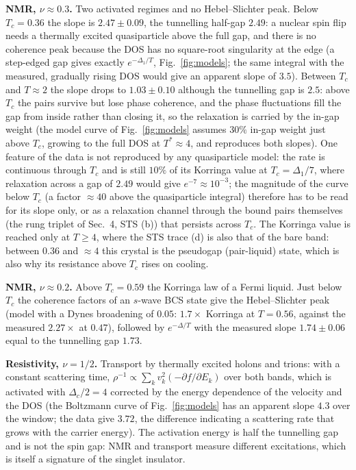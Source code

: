 \documentclass[11pt]{article}
\newcommand{\nuh}{\nu=1/2}
\newcommand{\nut}{\nu\approx0.3}
\newcommand{\nutw}{\nu\approx0.2}
\begin{document}
\textbf{NMR, $\nut$.} Two activated regimes and no Hebel--Slichter peak. Below $T_c=0.36$ the slope is $2.47\pm0.09$, the tunnelling half-gap $2.49$: a nuclear spin flip needs a thermally excited quasiparticle above the full gap, and there is no coherence peak because the DOS has no square-root singularity at the edge (a step-edged gap gives exactly $e^{-\Delta_1/T}$, Fig.~\ref{fig:models}; the same integral with the measured, gradually rising DOS would give an apparent slope of $3.5$). Between $T_c$ and $T\approx2$ the slope drops to $1.03\pm0.10$ although the tunnelling gap is $2.5$: above $T_c$ the pairs survive but lose phase coherence, and the phase fluctuations fill the gap from inside rather than closing it, so the relaxation is carried by the in-gap weight (the model curve of Fig.~\ref{fig:models} assumes $30\%$ in-gap weight just above $T_c$, growing to the full DOS at $T^*\approx4$, and reproduces both slopes). One feature of the data is not reproduced by any quasiparticle model: the rate is continuous through $T_c$ and is still $10\%$ of its Korringa value at $T_c=\Delta_1/7$, where relaxation across a gap of $2.49$ would give $e^{-7}\approx10^{-3}$; the magnitude of the curve below $T_c$ (a factor $\approx40$ above the quasiparticle integral) therefore has to be read for its slope only, or as a relaxation channel through the bound pairs themselves (the rung triplet of Sec.~4, STS (b)) that persists across $T_c$. The Korringa value is reached only at $T\ge4$, where the STS trace (d) is also that of the bare band: between $0.36$ and $\approx4$ this crystal is the pseudogap (pair-liquid) state, which is also why its resistance above $T_c$ rises on cooling.

\textbf{NMR, $\nutw$.} Above $T_c=0.59$ the Korringa law of a Fermi liquid. Just below $T_c$ the coherence factors of an $s$-wave BCS state give the Hebel--Slichter peak (model with a Dynes broadening of $0.05$: $1.7\times$ Korringa at $T=0.56$, against the measured $2.27\times$ at $0.47$), followed by $e^{-\Delta/T}$ with the measured slope $1.74\pm0.06$ equal to the tunnelling gap $1.73$.

\textbf{Resistivity, $\nuh$.} Transport by thermally excited holons and trions: with a constant scattering time, $\rho^{-1}\propto\sum_k v_k^2(-\partial f/\partial E_k)$ over both bands, which is activated with $\Delta_c/2=4$ corrected by the energy dependence of the velocity and the DOS (the Boltzmann curve of Fig.~\ref{fig:models} has an apparent slope $4.3$ over the window; the data give $3.72$, the difference indicating a scattering rate that grows with the carrier energy). The activation energy is half the tunnelling gap and is not the spin gap: NMR and transport measure different excitations, which is itself a signature of the singlet insulator.
\end{document}
